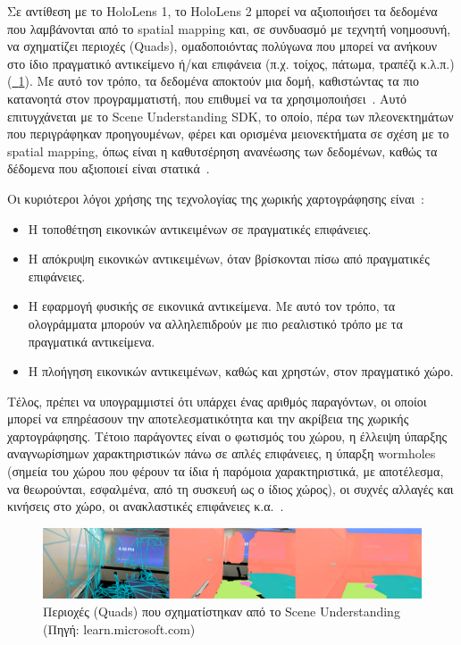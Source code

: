 Σε αντίθεση με το HoloLens 1, το HoloLens 2 μπορεί να αξιοποιήσει τα δεδομένα που λαμβάνονται από το spatial mapping και, σε συνδυασμό με τεχνητή νοημοσυνή, να σχηματίζει περιοχές (Quads), ομαδοποιόντας πολύγωνα που μπορεί να ανήκουν στο ίδιο πραγματικό αντικείμενο ή/και επιφάνεια (π.χ. τοίχος, πάτωμα, τραπέζι κ.λ.π.) (\hyperref[fig:sceneUnderstandingExample]{\schema~\ref*{fig:sceneUnderstandingExample}}). Με αυτό τον τρόπο, τα δεδομένα αποκτούν μια δομή, καθιστώντας τα πιο κατανοητά στον προγραμματιστή, που επιθυμεί να τα χρησιμοποιήσει~\cite{szymons_2022_scene}. Αυτό επιτυγχάνεται με το Scene Understanding SDK, το οποίο, πέρα των πλεονεκτημάτων που περιγράφηκαν προηγουμένων, φέρει και ορισμένα μειονεκτήματα σε σχέση με το spatial mapping, όπως είναι η καθυτσέρηση ανανέωσης των δεδομένων, καθώς τα δέδομενα που αξιοποιεί είναι στατικά~\cite{mattzmsft_2023_spatial}.

Οι κυριότεροι λόγοι χρήσης της τεχνολογίας της χωρικής χαρτογράφησης είναι~\cite{mattzmsft_2023_spatial}:
\begin{itemize}
    \item Η τοποθέτηση εικονικών αντικειμένων σε πραγματικές επιφάνειες.
    \item Η απόκρυψη εικονικών αντικειμένων, όταν βρίσκονται πίσω από πραγματικές επιφάνειες.
    \item Η εφαρμογή φυσικής σε εικονιικά αντικείμενα. Με αυτό τον τρόπο, τα ολογράμματα μπορούν να αλληλεπιδρούν με πιο ρεαλιστικό τρόπο με τα πραγματικά αντικείμενα.
    \item Η πλοήγηση εικονικών αντικειμένων, καθώς και χρηστών, στον πραγματικό χώρο.
\end{itemize}

Τέλος, πρέπει να υπογραμμιστεί ότι υπάρχει ένας αριθμός παραγόντων, οι οποίοι μπορεί να επηρέασουν την αποτελεσματικότητα και την ακρίβεια της χωρικής χαρτογράφησης. Τέτοιο παράγοντες είναι ο φωτισμός του χώρου, η έλλειψη ύπαρξης αναγνωρίσημων χαρακτηριστικών πάνω σε απλές επιφάνειες, η ύπαρξη wormholes (σημεία του χώρου που φέρουν τα ίδια ή παρόμοια χαρακτηριστικά, με αποτέλεσμα, να θεωρούνται, εσφαλμένα, από τη συσκευή ως ο ίδιος χώρος), οι συχνές αλλαγές και κινήσεις στο χώρο, οι ανακλαστικές επιφάνειες κ.α.~\cite{dorreneb_2022_hololens}.

\begin{figure}[!hb]
    \centering
    \includegraphics[width=1\textwidth]{images/sm_and_su_comparisson.png}
    \caption{Περιοχές (Quads) που σχηματίστηκαν από το Scene Understanding {\footnotesize (Πηγή: learn.microsoft.com)}}\label{fig:sceneUnderstandingExample}
\end{figure}

